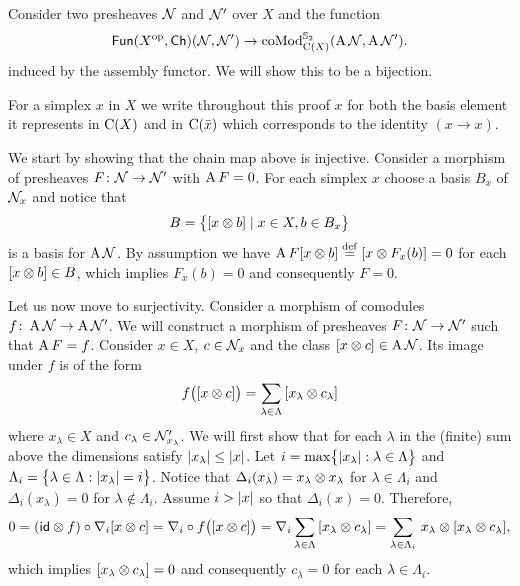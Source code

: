 
Consider two presheaves $\cN$ and $\cN'$ over $X$ and the function
\[
\Fun(X^\op, \Ch)(\cN, \cN') \to \coMod^{\Sym_2}_{\chains(X)}(\assembly \cN, \assembly \cN').
\]
induced by the assembly functor.
We will show this to be a bijection.

For a simplex $x$ in $X$ we write throughout this proof $x$ for both the basis element it represents in $\chains(X)$ and in $\chains(\bar x)$ which corresponds to the identity $(x \to x)$.

We start by showing that the chain map above is injective.
Consider a morphism of presheaves $F \colon \cN \to \cN'$ with $\assembly F = 0$.
For each simplex $x$ choose a basis $B_x$ of $\cN_x$ and notice that
\[
B = \set[\big]{[x \ot b] \mid x \in X, b \in B_x}
\]
is a basis for $\assembly \cN$.
By assumption we have $\assembly F [x \ot b] \defeq [x \ot F_x(b)] = 0$ for each $[x \ot b] \in B$, which implies $F_x(b) = 0$ and consequently $F = 0$.

Let us now move to surjectivity.
Consider a morphism of comodules $f \colon \assembly \cN \to \assembly \cN'$.
We will construct a morphism of presheaves $F \colon \cN \to \cN'$ such that $\assembly F = f$.
Consider $x \in X$, $c \in \cN_x$ and the class $[x \ot c] \in \assembly \cN$.
Its image under $f$ is of the form
\[
f \big( [x \ot c] \big) = \sum_{\lambda \in \Lambda} \, [x_\lambda \ot c_\lambda]
\]
where $x_\lambda \in X$ and $c_\lambda \in \cN'_{x_\lambda}$.
We will first show that for each $\lambda$ in the (finite) sum above the dimensions satisfy $\bars{x_\lambda} \leq \bars{x}$.
Let $i = \max \set[\big]{\bars{x_\lambda} : \lambda \in \Lambda}$ and $\Lambda_i = \set[\big]{\lambda \in \Lambda : \bars{x_\lambda} = i}$.
Notice that $\Delta_i(x_{\lambda}) = x_{\lambda} \ot x_{\lambda}$ for $\lambda \in \Lambda_i$ and $\Delta_i(x_{\lambda}) = 0$ for $\lambda \notin \Lambda_i$.
Assume $i > \bars{x}$ so that $\Delta_i(x) = 0$.
Therefore,
\begin{align*}
	0 =
	(\id \ot f) \circ \nabla_i [x \ot c] =
	\nabla_i \circ f \big( [x \ot c] \big) =
	\nabla_i \sum_{\lambda \in \Lambda} \, [x_\lambda \ot c_\lambda] =
	\sum_{\lambda \in \Lambda_i} \, x_\lambda \ot [x_\lambda \ot c_\lambda],
\end{align*}
which implies $[x_\lambda \ot c_\lambda] = 0$ and consequently $c_{\lambda} = 0$ for each $\lambda \in \Lambda_i$.

